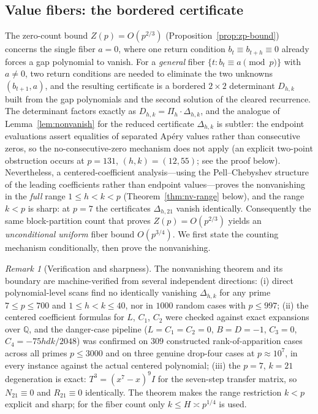 \documentclass[11pt]{article}
\theoremstyle{definition}
\theoremstyle{remark}
\newtheorem{remark}[theorem]{Remark}
\begin{document}
\subsection{Value fibers: the bordered certificate}
\label{ssec:value-fibers}

The zero-count bound $Z(p) = O(p^{2/3})$
(Proposition~\ref{prop:zp-bound}) concerns the single
fiber $a = 0$, where one return condition
$b_t \equiv b_{t+h} \equiv 0$ already forces a gap
polynomial to vanish.
For a \emph{general} fiber
$\{t : b_t \equiv a \pmod p\}$ with $a \ne 0$, two return
conditions are needed to eliminate the two unknowns
$(b_{t+1}, a)$, and the resulting certificate is a
bordered $2 \times 2$ determinant $D_{h,k}$ built from
the gap polynomials and the second solution of the
cleared recurrence.
The determinant factors exactly as
$D_{h,k} = \Pi_h \cdot \Delta_{h,k}$, and the analogue of
Lemma~\ref{lem:nonvanish} for the reduced certificate
$\Delta_{h,k}$ is subtler: the endpoint
evaluations assert equalities of separated Ap\'ery values
rather than consecutive zeros, so the no-consecutive-zero
mechanism does not apply (an explicit two-point
obstruction occurs at $p = 131$, $(h,k) = (12,55)$; see
the proof below).
Nevertheless, a centered-coefficient analysis---using the
Pell--Chebyshev structure of the leading coefficients
rather than endpoint values---proves the nonvanishing in
the \emph{full} range $1 \le h < k < p$
(Theorem~\ref{thm:nv-range} below), and the range $k < p$
is sharp: at $p = 7$ the certificates $\Delta_{h,21}$
vanish identically.
Consequently the same block-partition count that proves
$Z(p) = O(p^{2/3})$ yields an \emph{unconditional uniform}
fiber bound $O(p^{3/4})$.
We first state the counting mechanism conditionally, then
prove the nonvanishing.





\begin{remark}[Verification and sharpness]
\label{rem:nv-status}
The nonvanishing theorem and its boundary are
machine-verified from several independent directions:
(i) direct polynomial-level scans find no identically
vanishing $\Delta_{h,k}$ for any prime $7 \le p \le 700$
and $1 \le h < k \le 40$, nor in $1000$ random cases
with $p \le 997$;
(ii) the centered coefficient formulas for $L$, $C_1$,
$C_2$ were checked against exact expansions over
$\mathbb Q$, and the danger-case pipeline
($L = C_1 = C_2 = 0$, $B = D = -1$,
$C_3 = 0$, $C_4 = -75hdk/2048$) was confirmed on $309$
constructed rank-of-apparition cases across all primes
$p \le 3000$ and on three genuine drop-four cases at
$p \approx 10^7$, in every instance against the actual
centered polynomial;
(iii) the $p = 7$, $k = 21$ degeneration is exact:
$T^3 = (x^7 - x)^9 I$ for the seven-step transfer
matrix, so $N_{21} \equiv 0$ and $R_{21} \equiv 0$
identically.
The theorem makes the range restriction $k < p$
explicit and sharp; for the fiber count only
$k \le H \asymp p^{1/4}$ is used.
\end{remark}
\end{document}

